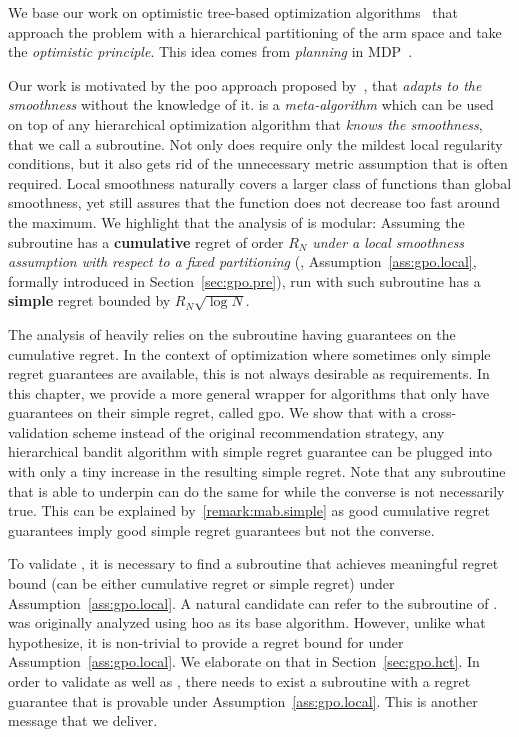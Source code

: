 We base our work on optimistic tree-based optimization algorithms~\citep{munos2011soo,valko2013stosoo,preux2014bandits,azar2014online} that approach the problem with a hierarchical partitioning of the arm space and take the \textit{optimistic principle}. This idea comes from \emph{planning} in MDP~\citep{kocsis2006bandit,munos2014,grill2016trail}.

Our work is motivated by the \gls{poo} approach proposed by~\citet{grill2015poo}, that \emph{adapts to the smoothness} without the knowledge of it. \POO is a \emph{meta-algorithm} which can be used on top of any hierarchical optimization algorithm that \emph{knows the smoothness}, that we call a subroutine. Not only does \POO require only the mildest local regularity conditions, but it also gets rid of the unnecessary metric assumption that is often required. Local smoothness naturally covers a larger class of functions than global smoothness, yet still assures that the function does not decrease too fast around the maximum. We highlight that the analysis of \POO{} is modular: Assuming the subroutine has a \textbf{cumulative} regret of order $R_N$ \emph{under a local smoothness assumption with respect to a fixed partitioning} (\citealt{grill2015poo}, Assumption~\ref{ass:gpo.local}, formally introduced in Section~\ref{sec:gpo.pre}), \POO{} run with such subroutine has a \textbf{simple} regret bounded by $R_N \sqrt{\log N}$. 

The analysis of \POO{} heavily relies on the subroutine having guarantees on the cumulative regret. In the context of optimization where sometimes only simple regret guarantees are available, this is not always desirable as requirements. In this chapter, we provide a more general wrapper for algorithms that only have guarantees on their simple regret, called \gls{gpo}. We show that with a cross-validation scheme instead of the original recommendation strategy, any hierarchical bandit algorithm with simple regret guarantee can be plugged into \GPO{} with only a tiny increase in the resulting simple regret. Note that any subroutine that is able to underpin \POO{} can do the same for \GPO{} while the converse is not necessarily true. This can be explained by~\ref{remark:mab.simple} as good cumulative regret guarantees imply good simple regret guarantees but not the converse.

To validate \GPO{}, it is necessary to find a subroutine that achieves meaningful regret bound (can be either cumulative regret or simple regret) under Assumption~\ref{ass:gpo.local}. A natural candidate can refer to the subroutine of \POO{}. \POO{} was originally analyzed using \gls{hoo} as its base algorithm. However, unlike what~\cite{grill2015poo} hypothesize, it is non-trivial to provide a regret bound for \HOO{} under Assumption~\ref{ass:gpo.local}. We elaborate on that in Section~\ref{sec:gpo.hct}. In order to validate \POO{} as well as \GPO{}, there needs to exist a subroutine with a regret guarantee that is provable under Assumption~\ref{ass:gpo.local}. This is another message that we deliver.


